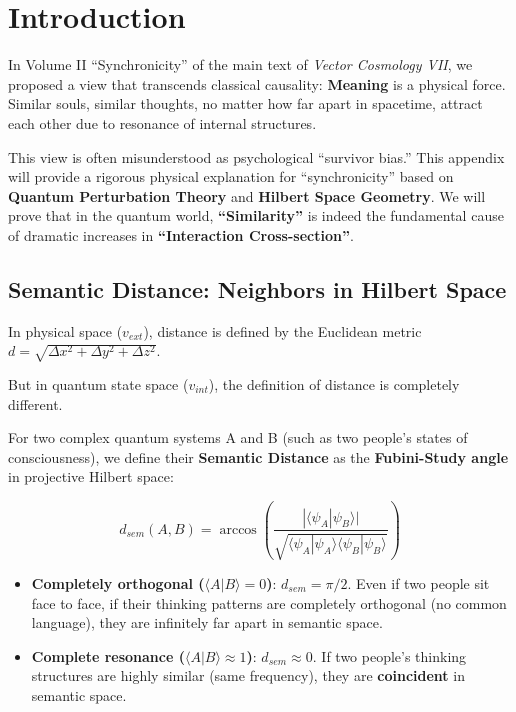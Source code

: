 \section{Introduction}

In Volume II ``Synchronicity'' of the main text of \textit{Vector Cosmology VII}, we proposed a view that transcends classical causality: \textbf{Meaning} is a physical force. Similar souls, similar thoughts, no matter how far apart in spacetime, attract each other due to resonance of internal structures.

This view is often misunderstood as psychological ``survivor bias.'' This appendix will provide a rigorous physical explanation for ``synchronicity'' based on \textbf{Quantum Perturbation Theory} and \textbf{Hilbert Space Geometry}. We will prove that in the quantum world, \textbf{``Similarity''} is indeed the fundamental cause of dramatic increases in \textbf{``Interaction Cross-section''}.

\subsection{Semantic Distance: Neighbors in Hilbert Space}

In physical space ($v_{ext}$), distance is defined by the Euclidean metric $d = \sqrt{\Delta x^2 + \Delta y^2 + \Delta z^2}$.

But in quantum state space ($v_{int}$), the definition of distance is completely different.

For two complex quantum systems A and B (such as two people's states of consciousness), we define their \textbf{Semantic Distance} as the \textbf{Fubini-Study angle} in projective Hilbert space:

\[d_{sem}(A, B) = \arccos \left( \frac{|\langle \psi_A | \psi_B \rangle|}{\sqrt{\langle \psi_A | \psi_A \rangle \langle \psi_B | \psi_B \rangle}} \right)\]

\begin{itemize}
\item \textbf{Completely orthogonal ($\langle A|B \rangle = 0$)}: $d_{sem} = \pi/2$. Even if two people sit face to face, if their thinking patterns are completely orthogonal (no common language), they are infinitely far apart in semantic space.

\item \textbf{Complete resonance ($\langle A|B \rangle \approx 1$)}: $d_{sem} \approx 0$. If two people's thinking structures are highly similar (same frequency), they are \textbf{coincident} in semantic space.
\end{itemize}

